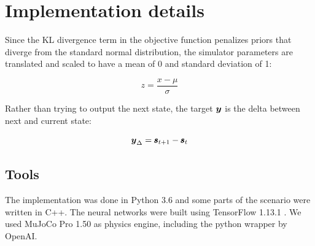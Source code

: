 \section{Implementation details}

Since the KL divergence term in the objective function penalizes priors that diverge from the standard normal distribution, the simulator parameters are translated and scaled to have a mean of 0 and standard deviation of 1:

\begin{equation*}
    z = \frac{x - \mu}{\sigma}
\end{equation*}

Rather than trying to output the next state, the target $\boldsymbol{y}$ is the delta between next and current state:

\begin{equation*}
    \boldsymbol{y}_{\Delta} = \pmb{s}_{t+1} - \pmb{s}_t
\end{equation*}

\subsection{Tools}

The implementation was done in Python 3.6 and some parts of the \yp{} scenario were written in C++. The neural networks were built using TensorFlow 1.13.1 \parencite{tensorflow2015-whitepaper}. We used MuJoCo Pro 1.50 as physics engine, including the python wrapper by OpenAI.
